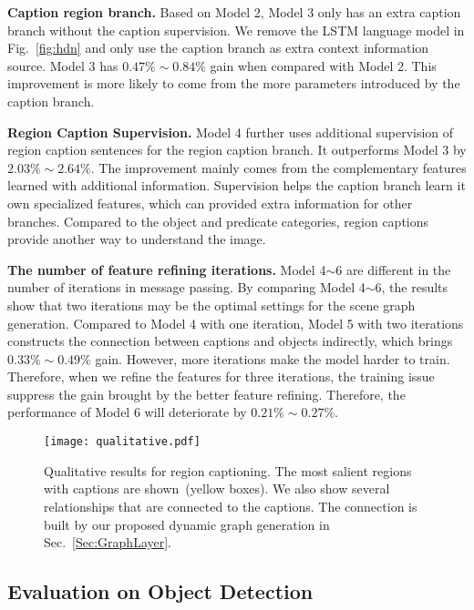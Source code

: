 \textbf{Caption region branch.} Based on Model 2, Model 3 only has an extra caption branch without the caption supervision. We remove the LSTM language model in Fig.~\ref{fig:hdn} and only use the caption branch as extra context information source. Model 3 has $0.47\%\sim0.84\%$ gain when compared with Model 2.  This improvement is more likely to come from the more parameters introduced by the caption branch.

\textbf{Region Caption Supervision.} Model 4 further uses additional supervision of region caption sentences for the region caption branch. It outperforms Model 3 by $2.03\%\sim 2.64\%$. The improvement mainly comes from the complementary features learned with additional information.  Supervision helps the caption branch learn it own specialized features, which can provided extra information for other branches. Compared to the object and predicate categories, region captions provide another way to understand the image. 

\textbf{The number of feature refining iterations.} Model 4$\sim$6 are different in the number of iterations in message passing. By comparing Model 4$\sim$6, the results show that two iterations may be the optimal settings for the scene graph generation. Compared to Model 4 with one iteration, Model 5 with two iterations constructs the connection between captions and objects indirectly, which brings $0.33\%\sim 0.49\%$ gain. However, more iterations make the model harder to train. Therefore, when we refine the features for three iterations, the training issue suppress the gain brought by the better feature refining. Therefore, the performance of Model 6 will deteriorate by $0.21\%\sim 0.27\%$.    


\begin{figure*}[t]
	\begin{center}
		\texttt{[image: qualitative.pdf]}
	\end{center}
	\caption{Qualitative results for region captioning. The most salient regions with captions are shown~(yellow boxes). We also show several relationships that are connected to the captions. The connection is built by our proposed dynamic graph generation in Sec.~\ref{Sec:GraphLayer}. }
	\label{fig:result}
\end{figure*}





\subsection{Evaluation on Object Detection}\label{sec:object_detection}

